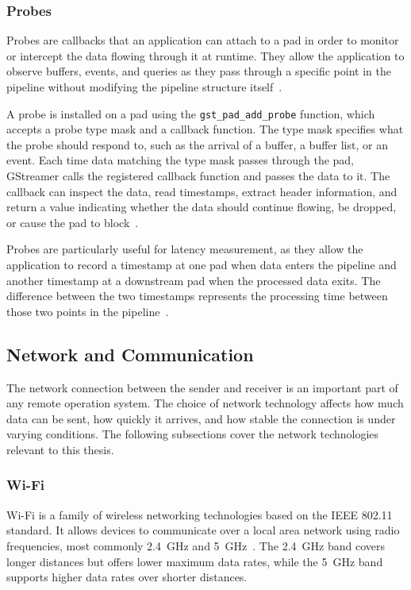 \subsubsection{Probes}\label{subsec:probes}
Probes are callbacks that an application can attach to a pad in order to monitor or intercept the data flowing through it at runtime. They allow the application to observe buffers, events, and queries as they pass through a specific point in the pipeline without modifying the pipeline structure itself~\cite{gstreamer_probes}.
 
A probe is installed on a pad using the \texttt{gst\_pad\_add\_probe} function, which accepts a probe type mask and a callback function. The type mask specifies what the probe should respond to, such as the arrival of a buffer, a buffer list, or an event. Each time data matching the type mask passes through the pad, GStreamer calls the registered callback function and passes the data to it. The callback can inspect the data, read timestamps, extract header information, and return a value indicating whether the data should continue flowing, be dropped, or cause the pad to block~\cite{gstreamer_probes}.
 
Probes are particularly useful for latency measurement, as they allow the application to record a timestamp at one pad when data enters the pipeline and another timestamp at a downstream pad when the processed data exits. The difference between the two timestamps represents the processing time between those two points in the pipeline~\cite{gstreamer_pipeline_manip}.

\vspace{5mm}
\subsection{Network and Communication}\label{subsec:network}
The network connection between the sender and receiver is an important part of any remote operation system. The choice of network technology affects how much data can be sent, how quickly it arrives, and how stable the connection is under varying conditions. The following subsections cover the network technologies relevant to this thesis.
 
\subsubsection{Wi-Fi}\label{subsec:wifi}
Wi-Fi is a family of wireless networking technologies based on the IEEE 802.11 standard. It allows devices to communicate over a local area network using radio frequencies, most commonly 2.4~GHz and 5~GHz~\cite{ieee80211}. The 2.4~GHz band covers longer distances but offers lower maximum data rates, while the 5~GHz band supports higher data rates over shorter distances.
 
